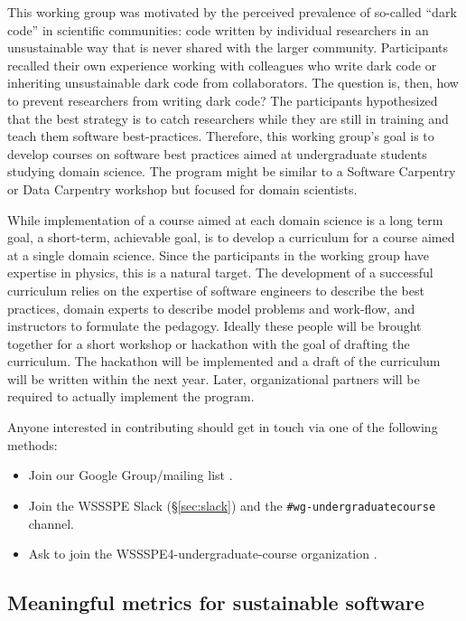 \documentclass[11pt, oneside]{amsart}
\begin{document}
This working group was motivated by the perceived prevalence of
so-called ``dark code'' in scientific communities: code written by
individual researchers in an unsustainable way that is never shared
with the larger community. Participants recalled their own experience
working with colleagues who write dark code or inheriting
unsustainable dark code from collaborators.
%
The question is, then, how to prevent researchers from writing dark
code? The participants hypothesized that the best strategy is to catch
researchers while they are still in training and teach them software
best-practices. Therefore, this working group's goal
is to develop courses on software best practices aimed at
undergraduate students studying domain science. The program might be
similar to a Software Carpentry or Data Carpentry workshop but 
focused for domain scientists.

While implementation of a course aimed at each domain science is a long term
goal, a short-term, achievable goal, is to develop a
curriculum for a course aimed at a single domain science. Since the
participants in the working group have expertise in physics, this is a
natural target.
%
The development of a successful curriculum relies on the expertise of
software engineers to describe the best practices, domain experts to
describe model problems and work-flow, and instructors to formulate
the pedagogy. Ideally these people will be brought together for a
short workshop or hackathon with the goal of drafting the
curriculum. The
hackathon will be implemented and a draft of the curriculum will be
written within the next year.
Later, organizational partners will be required to
actually implement the program.


Anyone interested in contributing should get in touch via one of the
following methods:

\begin{itemize}
\item Join our Google Group/mailing list
  \cite{WSSSPEUndergradGoogleGroup}.
\item Join the WSSSPE Slack (\S\ref{sec:slack}) and the
  \texttt{\#wg-undergraduatecourse} channel.
\item Ask to join the WSSSPE4-undergraduate-course organization
  \cite{WSSSPEUndergradGithub}.
\end{itemize}



\subsection{Meaningful metrics for sustainable software}
\label{sec:metrics}
\end{document}
